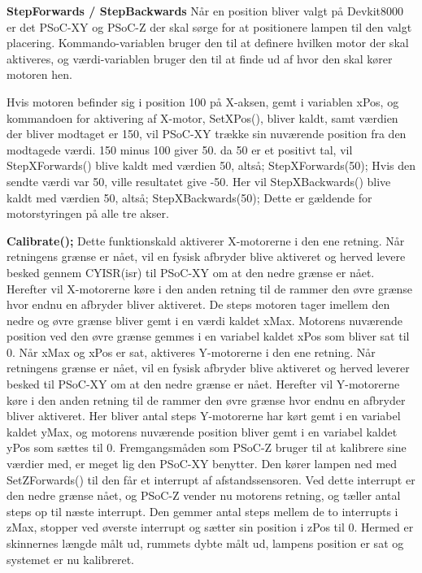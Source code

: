 \textbf{StepForwards / StepBackwards}\newline 
Når en position bliver valgt på Devkit8000 er det PSoC-XY og PSoC-Z der skal sørge for at positionere lampen til den valgt placering. Kommando-variablen bruger den til at definere hvilken motor der skal aktiveres, og værdi-variablen bruger den til at finde ud af hvor den skal kører motoren hen. 

Hvis motoren befinder sig i position 100 på X-aksen, gemt i variablen xPos, og kommandoen for aktivering af X-motor, SetXPos(), bliver kaldt, samt værdien der bliver modtaget er 150, vil PSoC-XY trække sin nuværende position fra den modtagede værdi. 150 minus 100 giver 50. da 50 er et positivt tal, vil StepXForwards() blive kaldt med værdien 50, altså; StepXForwards(50);
Hvis den sendte værdi var 50, ville resultatet give -50. Her vil StepXBackwards() blive kaldt med værdien 50, altså; StepXBackwards(50);
Dette er gældende for motorstyringen på alle tre akser. 

\textbf{Calibrate();}\newline 
Dette funktionskald aktiverer X-motorerne i den ene retning. Når retningens grænse er nået, vil en fysisk afbryder blive aktiveret og herved levere besked gennem CY\textunderscore{}ISR(isr\textunderscore{}) til PSoC-XY om at den nedre grænse er nået. Herefter vil X-motorerne køre i den anden retning til de rammer den øvre grænse hvor endnu en afbryder bliver aktiveret. \newline 
De steps motoren tager imellem den nedre og øvre grænse bliver gemt i en værdi kaldet xMax. Motorens nuværende position ved den øvre grænse gemmes i en variabel kaldet xPos som bliver sat til 0. 
\newline 
Når xMax og xPos er sat, aktiveres Y-motorerne i den ene retning. Når retningens grænse er nået, vil en fysisk afbryder blive aktiveret og herved leverer besked til PSoC-XY om at den nedre grænse er nået. Herefter vil Y-motorerne køre i den anden retning til de rammer den øvre grænse hvor endnu en afbryder bliver aktiveret. 
\newline 
Her bliver antal steps Y-motorerne har kørt gemt i en variabel kaldet yMax, og motorens nuværende position bliver gemt i en variabel kaldet yPos som sættes til 0. 
\newline
Fremgangsmåden som PSoC-Z bruger til at kalibrere sine værdier med, er meget lig den PSoC-XY benytter. Den kører lampen ned med SetZForwards() til den får et interrupt af afstandssensoren. Ved dette interrupt er den nedre grænse nået, og PSoC-Z vender nu motorens retning, og tæller antal steps op til næste interrupt. Den gemmer antal steps mellem de to interrupts i zMax, stopper ved øverste interrupt og sætter sin position i zPos til 0.
Hermed er skinnernes længde målt ud, rummets dybte målt ud, lampens position er sat og systemet er nu kalibreret.

